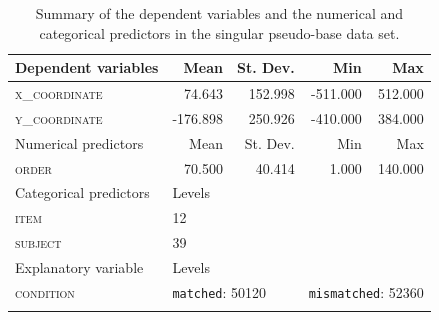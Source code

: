 \begin{table}\fontsize{10}{11}
\caption{Summary of the dependent variables and the numerical and categorical predictors in the singular pseudo-base data set.}
\label{tab:7.9}
\centering
\begin{tabular}{lrrrr} 
\lsptoprule
Dependent variables    & Mean     & St. Dev.                  & Min      & Max                           \\ 
\midrule
\textsc{x\_coordinate}          & 74.643   & 152.998                   & -511.000 & 512.000                       \\
\textsc{y\_coordinate}          & -176.898 & 250.926                   & -410.000 & 384.000                       \\ 
\midrule
Numerical predictors   & Mean     & St. Dev.                  & Min      & Max                           \\ 
\midrule
\textsc{order}                  & 70.500   & 40.414                    & 1.000    & 140.000                       \\ 
\midrule
Categorical predictors & \multicolumn{1}{l}{Levels}   & ~                         & ~        & ~                             \\ 
\midrule
\textsc{item}                   & \multicolumn{1}{l}{12}       & ~                         & ~        & ~                             \\
\textsc{subject}                & \multicolumn{1}{l}{39}       & ~                         & ~        & ~                             \\ 
\midrule
Explanatory variable   & \multicolumn{1}{l}{Levels}   & ~                         & ~        & ~                             \\ 
\midrule
\textsc{condition}              & \multicolumn{2}{l}{\texttt{matched}:
  50120} & \multicolumn{2}{l}{\texttt{mismatched}:
  52360}  \\
\lspbottomrule
\end{tabular}
\end{table}





